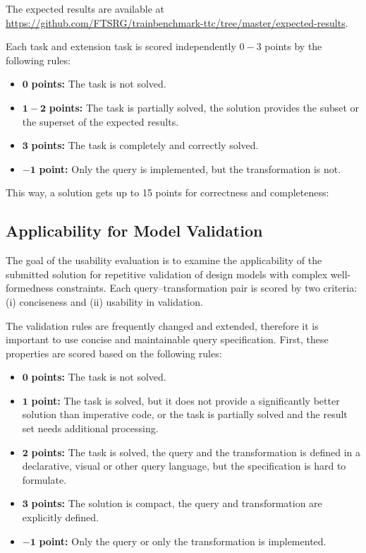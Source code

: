 \documentclass[submission,copyright,creativecommons]{eptcs}
\begin{document}
The expected results are available at \url{https://github.com/FTSRG/trainbenchmark-ttc/tree/master/expected-results}.

Each task and extension task is scored independently $0-3$ points by the following rules:
\begin{itemize}
  \item $\mathbf{0}$   \textbf{points:} The task is not solved.
  \item $\mathbf{1-2}$ \textbf{points:} The task is partially solved, the solution provides the subset or the superset of the expected results.
  \item $\mathbf{3}$   \textbf{points:} The task is completely and correctly solved.
  \item $\mathbf{-1}$  \textbf{point:} Only the query is implemented, but the transformation is not.
\end{itemize}

This way, a solution gets up to 15 points for correctness and completeness:

\noindent{}

\subsection{Applicability for Model Validation}

The goal of the usability evaluation is to examine the applicability of the submitted solution for repetitive validation of design models with complex well-formedness constraints. Each query--transformation pair is scored by two criteria: (i) conciseness and (ii) usability in validation.

The validation rules are frequently changed and extended, therefore it is important to use concise and maintainable query specification. First, these properties are scored based on the following rules:

\begin{itemize}
  \item $\mathbf{0}$   \textbf{points:} The task is not solved.
  \item $\mathbf{1}$   \textbf{point:} The task is solved, but it does not provide a significantly better solution than imperative code, or the task is partially solved and the result set needs additional processing.
  \item $\mathbf{2}$   \textbf{points:} The task is solved, the query and the transformation is defined in a declarative, visual or other query language, but the specification is hard to formulate.
  \item $\mathbf{3}$   \textbf{points:} The solution is compact, the query and transformation are explicitly defined.
  \item $\mathbf{-1}$  \textbf{point:} Only the query or only the transformation is implemented.
\end{itemize}
\end{document}
